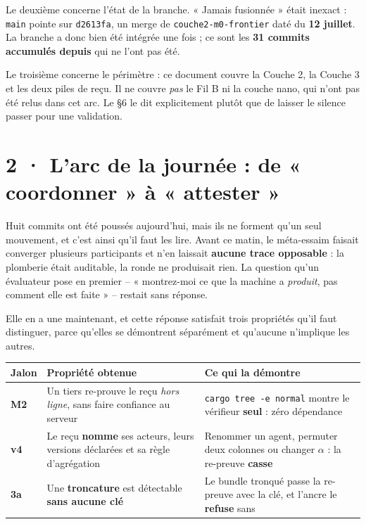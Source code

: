 \documentclass[10pt]{article}
\newcommand{\code}[1]{\texttt{\small #1}}
\begin{document}
Le deuxième concerne l'état de la branche. « Jamais fusionnée » était inexact : \code{main} pointe sur
\code{d2613fa}, un merge de \code{couche2-m0-frontier} daté du \textbf{12 juillet}. La branche a donc
bien été intégrée une fois ; ce sont les \textbf{31 commits accumulés depuis} qui ne l'ont pas été.

Le troisième concerne le périmètre : ce document couvre la Couche 2, la Couche 3 et les deux piles de
reçu. Il ne couvre \emph{pas} le Fil B ni la couche nano, qui n'ont pas été relus dans cet arc. Le §6
le dit explicitement plutôt que de laisser le silence passer pour une validation.

\section{2 · L'arc de la journée : de « coordonner » à « attester »}

Huit commits ont été poussés aujourd'hui, mais ils ne forment qu'un seul mouvement, et c'est ainsi
qu'il faut les lire. Avant ce matin, le méta-essaim faisait converger plusieurs participants et
n'en laissait \textbf{aucune trace opposable} : la plomberie était auditable, la ronde ne produisait
rien. La question qu'un évaluateur pose en premier -- « montrez-moi ce que la machine a
\emph{produit}, pas comment elle est faite » -- restait sans réponse.

Elle en a une maintenant, et cette réponse satisfait trois propriétés qu'il faut distinguer, parce
qu'elles se démontrent séparément et qu'aucune n'implique les autres.

\renewcommand{\arraystretch}{1.2}
\begin{center}\small
\begin{tabular}{@{}l >{\raggedright\arraybackslash}p{7.4cm} >{\raggedright\arraybackslash}p{6.1cm}@{}}
\toprule
\textbf{Jalon} & \textbf{Propriété obtenue} & \textbf{Ce qui la démontre} \\
\midrule
\textbf{M2} & Un tiers re-prouve le reçu \emph{hors ligne}, sans faire confiance au serveur &
  \code{cargo tree -e normal} montre le vérifieur \textbf{seul} : zéro dépendance \\
\textbf{v4} & Le reçu \textbf{nomme} ses acteurs, leurs versions déclarées et sa règle d'agrégation &
  Renommer un agent, permuter deux colonnes ou changer $\alpha$ : la re-preuve \textbf{casse} \\
\textbf{3a} & Une \textbf{troncature} est détectable \textbf{sans aucune clé} &
  Le bundle tronqué passe la re-preuve avec la clé, et l'ancre le \textbf{refuse} sans \\
\bottomrule
\end{tabular}
\end{center}
\end{document}
